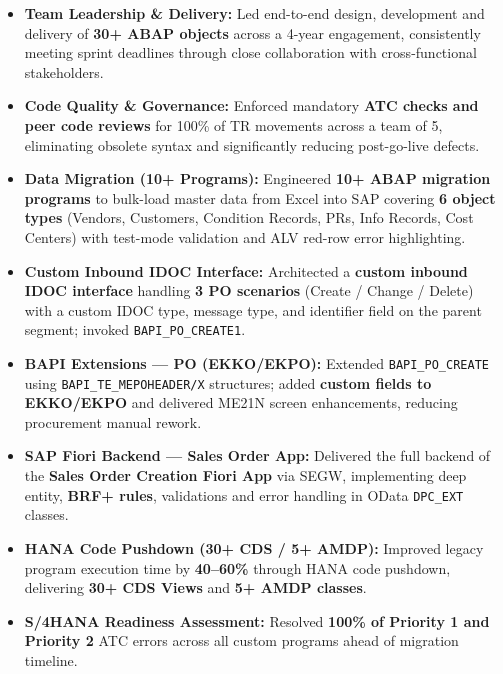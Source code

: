 \documentclass[10pt, a4paper]{article}
\begin{document}
\begin{itemize}
  \item \textbf{Team Leadership \& Delivery:}
        Led end-to-end design, development and delivery of \textbf{30+ ABAP objects}
        across a 4-year engagement, consistently meeting sprint deadlines through
        close collaboration with cross-functional stakeholders.

  \item \textbf{Code Quality \& Governance:}
        Enforced mandatory \textbf{ATC checks and peer code reviews} for 100\% of TR
        movements across a team of 5, eliminating obsolete syntax and significantly
        reducing post-go-live defects.

  \item \textbf{Data Migration (10+ Programs):}
        Engineered \textbf{10+ ABAP migration programs} to bulk-load master data from
        Excel into SAP covering \textbf{6 object types} (Vendors, Customers, Condition
        Records, PRs, Info Records, Cost Centers) with test-mode validation and
        ALV red-row error highlighting.

  \item \textbf{Custom Inbound IDOC Interface:}
        Architected a \textbf{custom inbound IDOC interface} handling \textbf{3 PO
        scenarios} (Create / Change / Delete) with a custom IDOC type, message type,
        and identifier field on the parent segment; invoked \texttt{BAPI\_PO\_CREATE1}.

  \item \textbf{BAPI Extensions --- PO (EKKO/EKPO):}
        Extended \texttt{BAPI\_PO\_CREATE} using \texttt{BAPI\_TE\_MEPOHEADER/X}
        structures; added \textbf{custom fields to EKKO/EKPO} and delivered ME21N
        screen enhancements, reducing procurement manual rework.

  \item \textbf{SAP Fiori Backend --- Sales Order App:}
        Delivered the full backend of the \textbf{Sales Order Creation Fiori App}
        via SEGW, implementing deep entity, \textbf{BRF+ rules}, validations and
        error handling in OData \texttt{DPC\_EXT} classes.

  \item \textbf{HANA Code Pushdown (30+ CDS / 5+ AMDP):}
        Improved legacy program execution time by \textbf{40--60\%} through HANA
        code pushdown, delivering \textbf{30+ CDS Views} and \textbf{5+ AMDP classes}.

  \item \textbf{S/4HANA Readiness Assessment:}
        Resolved \textbf{100\% of Priority 1 and Priority 2} ATC errors across all
        custom programs ahead of migration timeline.


\end{itemize}
\end{document}
